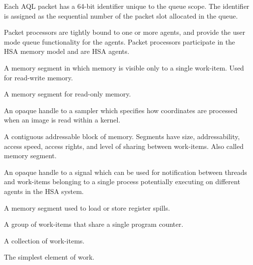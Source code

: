 \documentclass[oneside]{book}
\begin{document}
\begin{description}[itemsep=5pt,leftmargin=0cm, labelindent=0cm]
\item[Packet ID] Each AQL packet has a 64-bit identifier unique to the queue
  scope. The identifier is assigned as the sequential number of the packet slot
  allocated in the queue.

\item[Packet processor] Packet processors are tightly bound to one or more
  agents, and provide the user mode queue functionality for the agents. Packet
  processors participate in the HSA memory model and are HSA agents.

\item[Private segment] A memory segment in which memory is visible only to a
  single work-item. Used for read-write memory.

\item[Readonly segment] A memory segment for read-only memory.

\item[Sampler handle] An opaque handle to a sampler which specifies how
  coordinates are processed when an image is read within a kernel.

\item[Segment] A contiguous addressable block of memory. Segments have size,
  addressability, access speed, access rights, and level of sharing between
  work-items. Also called memory segment.

\item[Signal (handle)] An opaque handle to a signal which can be used for
  notification between threads and work-items belonging to a single process
  potentially executing on different agents in the HSA system.

\item[Spill segment] A memory segment used to load or store register spills.

\item[Wavefront] A group of work-items that share a single program counter.

\item[Work-group] A collection of work-items.

\item[Work-item] The simplest element of work.

\end{description}

\newpage
{}
\printindex[api]
\printindex[ext]


\begin{thebibliography}{30}



\end{thebibliography}
\end{document}
